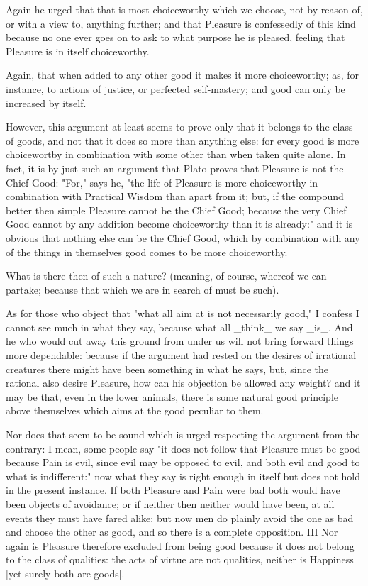 Again he urged that that is most choiceworthy which we choose, not by
reason of, or with a view to, anything further; and that Pleasure is
confessedly of this kind because no one ever goes on to ask to what
purpose he is pleased, feeling that Pleasure is in itself choiceworthy.

Again, that when added to any other good it makes it more choiceworthy;
as, for instance, to actions of justice, or perfected self-mastery; and
good can only be increased by itself.

However, this argument at least seems to prove only that it belongs to
the class of goods, and not that it does so more than anything else: for
every good is more choicewortby in combination with some other than when
taken quite alone. In fact, it is by just such an argument that Plato
proves that Pleasure is not the Chief Good: "For," says he, "the life of
Pleasure is more choiceworthy in combination with Practical Wisdom than
apart from it; but, if the compound better then simple Pleasure cannot
be the Chief Good; because the very Chief Good cannot by any addition
become choiceworthy than it is already:" and it is obvious that nothing
else can be the Chief Good, which by combination with any of the things
in themselves good comes to be more choiceworthy.

What is there then of such a nature? (meaning, of course, whereof we can
partake; because that which we are in search of must be such).

As for those who object that "what all aim at is not necessarily good,"
I confess I cannot see much in what they say, because what all _think_
we say _is_. And he who would cut away this ground from under us will
not bring forward things more dependable: because if the argument had
rested on the desires of irrational creatures there might have been
something in what he says, but, since the rational also desire Pleasure,
how can his objection be allowed any weight? and it may be that, even in
the lower animals, there is some natural good principle above themselves
which aims at the good peculiar to them.

Nor does that seem to be sound which is urged respecting the argument
from the contrary: I mean, some people say "it does not follow that
Pleasure must be good because Pain is evil, since evil may be opposed to
evil, and both evil and good to what is indifferent:" now what they say
is right enough in itself but does not hold in the present instance.
If both Pleasure and Pain were bad both would have been objects of
avoidance; or if neither then neither would have been, at all events
they must have fared alike: but now men do plainly avoid the one as bad
and choose the other as good, and so there is a complete opposition. III
Nor again is Pleasure therefore excluded from being good because it
does not belong to the class of qualities: the acts of virtue are not
qualities, neither is Happiness [yet surely both are goods].

